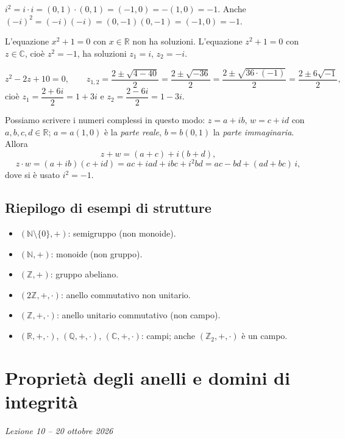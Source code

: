 \documentclass[11pt,a4paper]{article}
\begin{document}
\begin{osservazione}
$i^2 = i\cdot i = (0, 1)\cdot(0, 1) = (-1, 0) = -(1, 0) = -1$. Anche $(-i)^2 = (-i)(-i) = (0, -1)(0, -1) = (-1, 0) = -1$.
\end{osservazione}

L'equazione $x^2 + 1 = 0$ con $x \in \mathbb{R}$ non ha soluzioni. L'equazione $z^2 + 1 = 0$ con $z \in \mathbb{C}$, cioè $z^2 = -1$, ha soluzioni $z_1 = i$, $z_2 = -i$.

\begin{esempio}
\[
  z^2 - 2z + 10 = 0, \qquad
  z_{1,2} = \frac{2 \pm \sqrt{4 - 40}}{2} = \frac{2 \pm \sqrt{-36}}{2} = \frac{2 \pm \sqrt{36\cdot(-1)}}{2} = \frac{2 \pm 6\sqrt{-1}}{2} ,
\]
cioè $z_1 = \dfrac{2 + 6i}{2} = 1 + 3i$ e $z_2 = \dfrac{2 - 6i}{2} = 1 - 3i$.
\end{esempio}

Possiamo scrivere i numeri complessi in questo modo: $z = a + ib$, $w = c + id$ con $a, b, c, d \in \mathbb{R}$; $a = a(1, 0)$ è la \emph{parte reale}, $b = b(0, 1)$ la \emph{parte immaginaria}. Allora
\[
  z + w = (a + c) + i(b + d),
\]
\[
  z \cdot w = (a + ib)(c + id) = ac + iad + ibc + i^2 bd = ac - bd + (ad + bc)\,i ,
\]
dove si è usato $i^2 = -1$.

\subsection{Riepilogo di esempi di strutture}

\begin{itemize}
  \item $(\mathbb{N}\setminus\{0\}, +)$: semigruppo (non monoide).
  \item $(\mathbb{N}, +)$: monoide (non gruppo).
  \item $(\mathbb{Z}, +)$: gruppo abeliano.
  \item $(2\mathbb{Z}, +, \cdot)$: anello commutativo non unitario.
  \item $(\mathbb{Z}, +, \cdot)$: anello unitario commutativo (non campo).
  \item $(\mathbb{R}, +, \cdot)$, $(\mathbb{Q}, +, \cdot)$, $(\mathbb{C}, +, \cdot)$: campi; anche $(\mathbb{Z}_2, +, \cdot)$ è un campo.
\end{itemize}

\section[Proprietà degli anelli e domini di integrità (Lezione 10 -- 20 ottobre 2026)]{Proprietà degli anelli e domini di integrità}
\noindent\emph{Lezione 10 -- 20 ottobre 2026}
\end{document}

